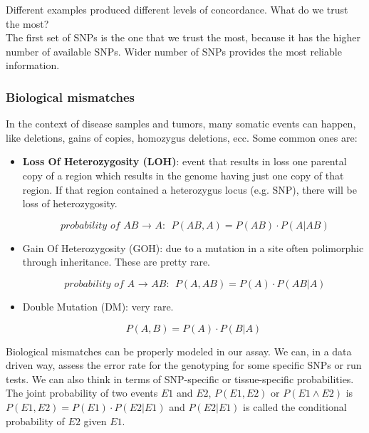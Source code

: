 Different examples produced different levels of concordance. What do we trust the most?
\\
The first set of SNPs is the one that we trust the most, because it has the higher number of available SNPs. Wider number of SNPs provides the most reliable information.

\subsubsection{Biological mismatches}
In the context of disease samples and tumors, many somatic events can happen, like deletions, gains of copies, homozygus deletions, ecc. Some common ones are:
\begin{itemize}
	\item  \textbf{Loss Of Heterozygosity (LOH)}:  event that results in loss one parental copy of a region which results in the genome having just one copy of that region. If that region contained a heterozygus locus (e.g. SNP), there will be loss of heterozygosity.

	\begin{equation}
	\textit{probability of AB $\rightarrow$ A: }P(AB,A) = P(AB) \cdot P(A | AB)
	\end{equation}

	\item Gain Of Heterozygosity (GOH): due to a mutation in a site often polimorphic through inheritance. These are pretty rare.

	\begin{equation}
	\textit{probability of A $\rightarrow$ AB: }P(A,AB) = P(A) \cdot P(AB | A)
	\end{equation}

	\item Double Mutation (DM): very rare.


	\begin{equation}
	P(A,B) = P(A) \cdot P(B | A)
	\end{equation}
\end{itemize}


Biological mismatches can be properly modeled in our assay. We can, in a data driven way, assess the error rate for the genotyping for some specific SNPs or run tests. We can also think in terms of SNP-specific or tissue-specific probabilities.
\\
The joint probability of two events $E1$ and $E2$, $P(E1,E2)$ or $P(E1 \land E2)$ is $P(E1,E2) = P(E1) \cdot P(E2|E1)$ and $P(E2|E1)$ is called the conditional probability of $E2$ given $E1$.
\\

